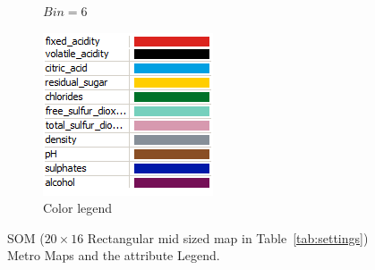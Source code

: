 \documentclass{acm_proc_article-sp}
\begin{document}
\begin{figure}
\begin{subfigure}[b]{0.48\linewidth}
        \caption{$Bin=6$}
        \label{fig:wine-newmid-metro-map-bin-6}
    \end{subfigure}
    \begin{subfigure}[b]{0.30\linewidth}
        \includegraphics[width=\linewidth]{img/wine-newmid-thematic-metro-map-legend}
        \caption{Color legend}
    \end{subfigure}
    \caption{SOM ($20\times16$ Rectangular mid sized map in Table~\ref{tab:settings}) Metro Maps and the attribute Legend.}
    \label{fig:wine-newmid-metro-maps}
\end{figure}
\end{document}
